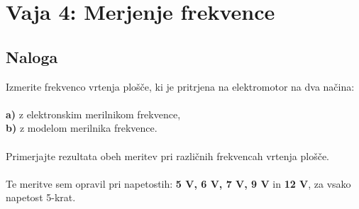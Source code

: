 \documentclass{report}
\begin{document}
\chapter{Vaja 4: Merjenje frekvence}

\section{Naloga}
Izmerite frekvenco vrtenja plošče, ki je pritrjena na elektromotor na dva načina:\\\\
\textbf{a)} z elektronskim merilnikom frekvence,\\
\textbf{b)} z modelom merilnika frekvence.\\\\
Primerjajte rezultata obeh meritev pri različnih frekvencah vrtenja plošče.\\\\
Te meritve sem opravil pri napetostih: \textbf{5 V, 6 V, 7 V, 9 V} in \textbf{12 V}, za vsako napetost 5-krat.
\end{document}
